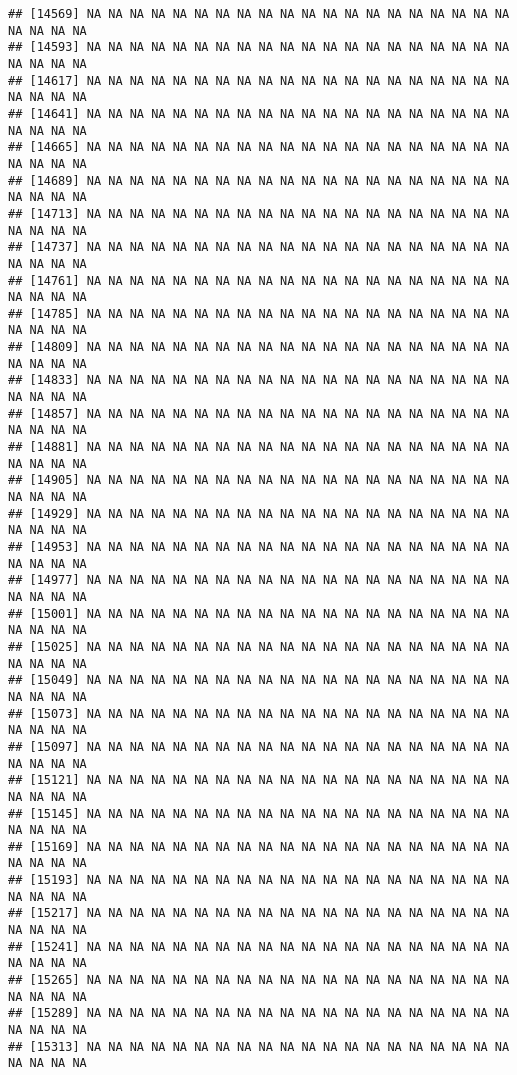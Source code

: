 \documentclass[
]{article}
\begin{document}
\begin{verbatim}
## [14569] NA NA NA NA NA NA NA NA NA NA NA NA NA NA NA NA NA NA NA NA NA NA NA NA
## [14593] NA NA NA NA NA NA NA NA NA NA NA NA NA NA NA NA NA NA NA NA NA NA NA NA
## [14617] NA NA NA NA NA NA NA NA NA NA NA NA NA NA NA NA NA NA NA NA NA NA NA NA
## [14641] NA NA NA NA NA NA NA NA NA NA NA NA NA NA NA NA NA NA NA NA NA NA NA NA
## [14665] NA NA NA NA NA NA NA NA NA NA NA NA NA NA NA NA NA NA NA NA NA NA NA NA
## [14689] NA NA NA NA NA NA NA NA NA NA NA NA NA NA NA NA NA NA NA NA NA NA NA NA
## [14713] NA NA NA NA NA NA NA NA NA NA NA NA NA NA NA NA NA NA NA NA NA NA NA NA
## [14737] NA NA NA NA NA NA NA NA NA NA NA NA NA NA NA NA NA NA NA NA NA NA NA NA
## [14761] NA NA NA NA NA NA NA NA NA NA NA NA NA NA NA NA NA NA NA NA NA NA NA NA
## [14785] NA NA NA NA NA NA NA NA NA NA NA NA NA NA NA NA NA NA NA NA NA NA NA NA
## [14809] NA NA NA NA NA NA NA NA NA NA NA NA NA NA NA NA NA NA NA NA NA NA NA NA
## [14833] NA NA NA NA NA NA NA NA NA NA NA NA NA NA NA NA NA NA NA NA NA NA NA NA
## [14857] NA NA NA NA NA NA NA NA NA NA NA NA NA NA NA NA NA NA NA NA NA NA NA NA
## [14881] NA NA NA NA NA NA NA NA NA NA NA NA NA NA NA NA NA NA NA NA NA NA NA NA
## [14905] NA NA NA NA NA NA NA NA NA NA NA NA NA NA NA NA NA NA NA NA NA NA NA NA
## [14929] NA NA NA NA NA NA NA NA NA NA NA NA NA NA NA NA NA NA NA NA NA NA NA NA
## [14953] NA NA NA NA NA NA NA NA NA NA NA NA NA NA NA NA NA NA NA NA NA NA NA NA
## [14977] NA NA NA NA NA NA NA NA NA NA NA NA NA NA NA NA NA NA NA NA NA NA NA NA
## [15001] NA NA NA NA NA NA NA NA NA NA NA NA NA NA NA NA NA NA NA NA NA NA NA NA
## [15025] NA NA NA NA NA NA NA NA NA NA NA NA NA NA NA NA NA NA NA NA NA NA NA NA
## [15049] NA NA NA NA NA NA NA NA NA NA NA NA NA NA NA NA NA NA NA NA NA NA NA NA
## [15073] NA NA NA NA NA NA NA NA NA NA NA NA NA NA NA NA NA NA NA NA NA NA NA NA
## [15097] NA NA NA NA NA NA NA NA NA NA NA NA NA NA NA NA NA NA NA NA NA NA NA NA
## [15121] NA NA NA NA NA NA NA NA NA NA NA NA NA NA NA NA NA NA NA NA NA NA NA NA
## [15145] NA NA NA NA NA NA NA NA NA NA NA NA NA NA NA NA NA NA NA NA NA NA NA NA
## [15169] NA NA NA NA NA NA NA NA NA NA NA NA NA NA NA NA NA NA NA NA NA NA NA NA
## [15193] NA NA NA NA NA NA NA NA NA NA NA NA NA NA NA NA NA NA NA NA NA NA NA NA
## [15217] NA NA NA NA NA NA NA NA NA NA NA NA NA NA NA NA NA NA NA NA NA NA NA NA
## [15241] NA NA NA NA NA NA NA NA NA NA NA NA NA NA NA NA NA NA NA NA NA NA NA NA
## [15265] NA NA NA NA NA NA NA NA NA NA NA NA NA NA NA NA NA NA NA NA NA NA NA NA
## [15289] NA NA NA NA NA NA NA NA NA NA NA NA NA NA NA NA NA NA NA NA NA NA NA NA
## [15313] NA NA NA NA NA NA NA NA NA NA NA NA NA NA NA NA NA NA NA NA NA NA NA NA

\end{verbatim}
\end{document}
